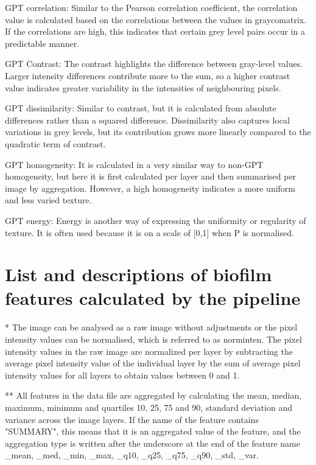 \documentclass{ol-softwaremanual}
\begin{document}
GPT correlation: Similar to the Pearson correlation coefficient, the correlation value is calculated based on the correlations between the values in graycomatrix. If the correlations are high, this indicates that certain grey level pairs occur in a predictable manner.

GPT Contrast: The contrast highlights the difference between gray-level values. Larger intensity differences contribute more to the sum, so a higher contrast value indicates greater variability in the intensities of neighbouring pixels.

GPT dissimilarity: Similar to contrast, but it is calculated from absolute differences rather than a squared difference. Dissimilarity also captures local variations in grey levels, but its contribution grows more linearly compared to the quadratic term of contrast.

GPT homogeneity: It is calculated in a very similar way to non-GPT homogeneity, but here it is first calculated per layer and then summarised per image by aggregation. However, a high homogeneity indicates a more uniform and less varied texture.

GPT energy: Energy is another way of expressing the uniformity or regularity of texture. It is often used because it is on a scale of [0,1] when P is normalised. 

\FloatBarrier

\appendix


\section{List and descriptions of biofilm features calculated by the pipeline\label{apdx:features}}


* The image can be analysed as a raw image without adjustments or the pixel intensity values  can be normalised, which is referred to as norminten. The pixel intensity values  in the  raw image are normalized per layer by subtracting the average pixel intensity value of the individual layer by the sum of average pixel intensity values for all layers to obtain values between 0 and 1.

** All features in the data file are aggregated by calculating the mean, median, maximum, minimum and quartiles 10, 25, 75 and 90, standard deviation and variance across the image layers. If the name of the feature contains "SUMMARY", this means that it is an aggregated value of the feature, and the aggregation type is written after the underscore at the end of the feature name \_mean, \_med, \_min, \_max, \_q10, \_q25, \_q75, \_q90, \_std, \_var.
\end{document}
